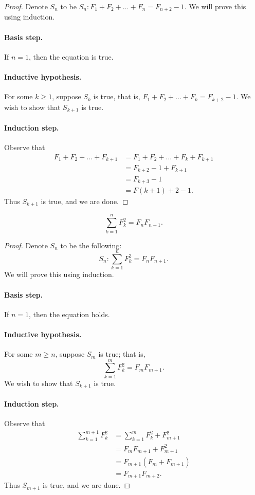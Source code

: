 \documentclass{exam}
\begin{document}
\begin{proof}
    Denote $S_n$ to be $S_n:F_1+F_2+\dots+F_n=F_{n+2}-1.$ We will prove this using induction.

    \paragraph{Basis step.} If $n = 1$, then the equation is true.

    \paragraph{Inductive hypothesis.} For some $k\ge 1$, suppose $S_k$ is true, that is, $F_1+F_2+\dots+F_k=F_{k+2}-1$. We wish to show that $S_{k+1}$ is true.

    \paragraph{Induction step.} Observe that
    \begin{align*}
        F_1+F_2+\dots+F_{k+1} &= F_1 + F_2 + \dots + F_k + F_{k+1}\\
        &= F_{k+2} - 1 + F_{k+1}\\
        &= F_{k+3} - 1\\
        &= F{(k+1) + 2} - 1.
    \end{align*}
    Thus $S_{k+1}$ is true, and we are done.
\end{proof}

\begin{proposition}{10.26}
    $$\sum_{k=1}^nF^2_k = F_nF_{n+1}.$$
\end{proposition}

\begin{proof}
    Denote $S_n$ to be the following: $$S_n:\sum_{k=1}^nF^2_k = F_nF_{n+1}.$$ We will prove this using induction.

    \paragraph{Basis step.} If $n = 1$, then the equation holds.

    \paragraph{Inductive hypothesis.} For some $m\ge n$, suppose $S_m$ is true; that is, $$\sum_{k=1}^mF^2_k = F_mF_{m+1}.$$ We wish to show that $S_{k+1}$ is true.

    \paragraph{Induction step.} Observe that
    \begin{align*}
        \sum_{k=1}^{m+1}F_k^2 &= \sum_{k=1}^mF_k^2 + F_{m+1}^2\\
        &= F_mF_{m+1}+F_{m+1}^2\\
        &= F_{m+1}(F_m+F_{m+1})\\
        &= F_{m+1}F_{m+2}.
    \end{align*}
    Thus $S_{m+1}$ is true, and we are done.
\end{proof}
\end{document}
